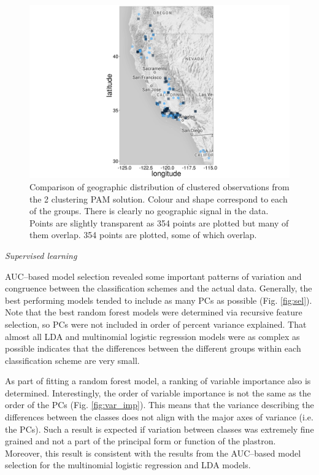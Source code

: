 \documentclass[12pt,letterpaper]{article}
\renewcommand{\subsection}[1]{%
\bigskip
\begin{center}
\begin{large}
\normalfont\itshape #1
\end{large}
\end{center}}
\begin{document}
\begin{figure}[h]
  \centering
  \includegraphics[height = 0.5\textheight, width = \textwidth, keepaspectratio = true]{figure/gap_map}
  \caption{Comparison of geographic distribution of clustered observations from the 2 clustering PAM solution. Colour and shape correspond to each of the groups. There is clearly no geographic signal in the data. Points are slightly transparent as 354 points are plotted but many of them overlap. 354 points are plotted, some of which overlap.}
  \label{fig:gap_map}
\end{figure}


\subsection{Supervised learning}
AUC--based model selection revealed some important patterns of variation and congruence between the classification schemes and the actual data. Generally, the best performing models tended to include as many PCs as possible (Fig. \ref{fig:sel}). Note that the best random forest models were determined via recursive feature selection, so PCs were not included in order of percent variance explained. That almost all LDA and multinomial logistic regression models were as complex as possible indicates that the differences between the different groups within each classification scheme are very small.

As part of fitting a random forest model, a ranking of variable importance also is determined. Interestingly, the order of variable importance is not the same as the order of the PCs (Fig. \ref{fig:var_imp}). This means that the variance describing the differences between the classes does not align with the major axes of variance (i.e. the PCs). Such a result is expected if variation between classes was extremely fine grained and not a part of the principal form or function of the plastron. Moreover, this result is consistent with the results from the AUC--based model selection for the multinomial logistic regression and LDA models.
\end{document}
